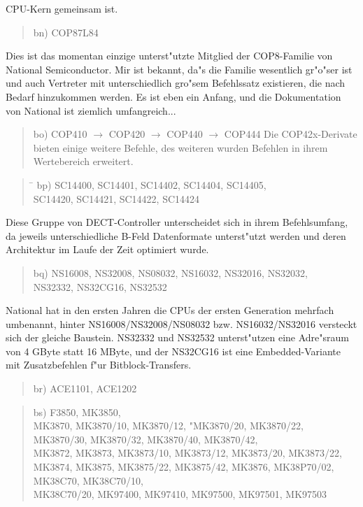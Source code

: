 \documentclass[12pt,a4paper,twoside]{report}
\begin{document}
CPU-Kern gemeinsam ist.
\begin{quote}
bn) COP87L84
\end{quote}
Dies ist das momentan einzige unterst"utzte Mitglied der COP8-Familie
von National Semiconductor.  Mir ist bekannt, da"s die Familie
wesentlich gr"o"ser ist und auch Vertreter mit unterschiedlich gro"sem
Befehlssatz existieren, die nach Bedarf hinzukommen werden.  Es ist eben
ein Anfang, und die Dokumentation von National ist ziemlich umfangreich...
\begin{quote}
bo) COP410 $\rightarrow$ COP420 $\rightarrow$ COP440 $\rightarrow$ COP444
Die COP42x-Derivate bieten einige weitere Befehle, des weiteren wurden
Befehlen in ihrem Wertebereich erweitert.
\end{quote}
\begin{quote}
\begin{tabbing}
\hspace{0.7cm} \= \kill
bp) \> SC14400, SC14401, SC14402, SC14404, SC14405, \\
    \> SC14420, SC14421, SC14422, SC14424 \\
\end{tabbing}
\end{quote}
Diese Gruppe von DECT-Controller unterscheidet sich in ihrem
Befehlsumfang, da jeweils unterschiedliche B-Feld Datenformate
unterst"utzt werden und deren Architektur im Laufe der Zeit optimiert
wurde.
\begin{quote}
bq) NS16008, NS32008, NS08032, NS16032, NS32016, NS32032, \\
    NS32332, NS32CG16, NS32532
\end{quote}
National hat in den ersten Jahren die CPUs der ersten Generation
mehrfach umbenannt, hinter NS16008/NS32008/NS08032 bzw.
NS16032/NS32016 versteckt sich der gleiche Baustein.  NS32332
und NS32532 unterst"utzen eine Adre"sraum von 4 GByte statt 16 MByte,
und der NS32CG16 ist eine Embedded-Variante mit Zusatzbefehlen f"ur
Bitblock-Transfers.
\begin{quote}
br) ACE1101, ACE1202
\end{quote}
\begin{quote}
bs) F3850, MK3850, \\
    MK3870, MK3870/10, MK3870/12, "MK3870/20, MK3870/22, \\
    MK3870/30, MK3870/32, MK3870/40, MK3870/42, \\
    MK3872, MK3873, MK3873/10, MK3873/12, MK3873/20, MK3873/22, \\
    MK3874, MK3875, MK3875/22, MK3875/42, MK3876, MK38P70/02, \\
    MK38C70, MK38C70/10, \\
    MK38C70/20, MK97400, MK97410, MK97500, MK97501, MK97503
\end{quote}
\end{document}
